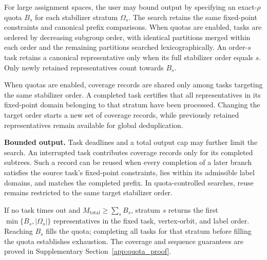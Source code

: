 \documentclass[a5paper, 10pt]{article}
\begin{document}
For large assignment spaces, the user may bound output by specifying an exact-$\rho$ quota $B_s$ for each stabilizer stratum $\Omega_s$. The search retains the same fixed-point constraints and canonical prefix comparisons. When quotas are enabled, tasks are ordered by decreasing subgroup order, with identical partitions merged within each order and the remaining partitions searched lexicographically. An order-$s$ task retains a canonical representative only when its full stabilizer order equals $s$. Only newly retained representatives count towards $B_s$.

When quotas are enabled, coverage records are shared only among tasks targeting the same stabilizer order. A completed task certifies that all representatives in its fixed-point domain belonging to that stratum have been processed. Changing the target order starts a new set of coverage records, while previously retained representatives remain available for global deduplication.

\medskip
\noindent\textbf{Bounded output.}
Task deadlines and a total output cap may further limit the search. An interrupted task contributes coverage records only for its completed subtrees. Such a record can be reused when every completion of a later branch satisfies the source task's fixed-point constraints, lies within its admissible label domains, and matches the completed prefix. In quota-controlled searches, reuse remains restricted to the same target stabilizer order.

If no task times out and $M_{\mathrm{total}}\geq\sum_sB_s$, stratum $s$ returns the first $\min\{B_s,|\Omega_s|\}$ representatives in the fixed task, vertex-orbit, and label order. Reaching $B_s$ fills the quota; completing all tasks for that stratum before filling the quota establishes exhaustion. The coverage and sequence guarantees are proved in Supplementary Section~\ref{app:quota_proof}.
\end{document}
